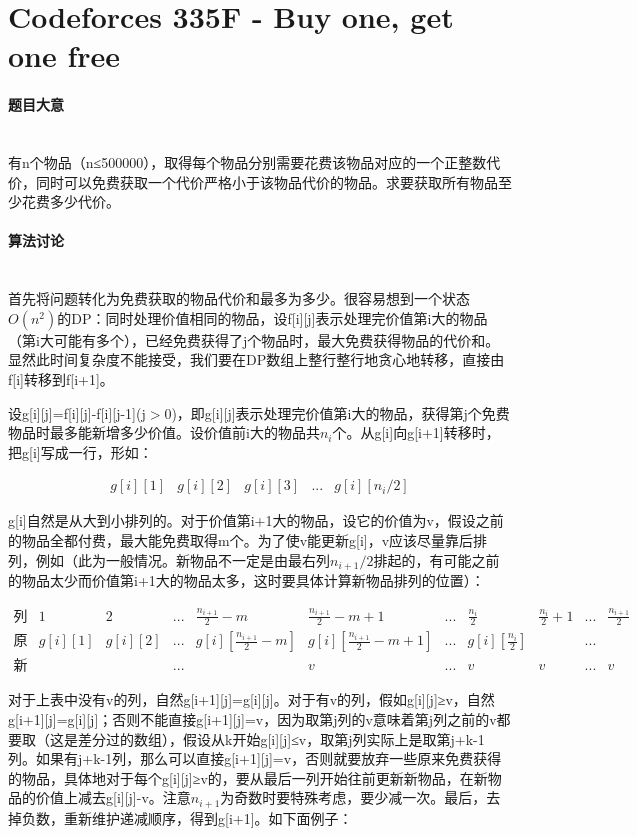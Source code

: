 \documentclass[UTF8]{ctexart}
\newcommand{\myparagraph}[1]{\paragraph{#1}\mbox{}\\}
\theoremstyle{nonumberplain}
\begin{document}
	\section{Codeforces 335F - Buy one, get one free}
	
		\myparagraph{题目大意}
			
			有n个物品（n≤500000），取得每个物品分别需要花费该物品对应的一个正整数代价，同时可以免费获取一个代价严格小于该物品代价的物品。求要获取所有物品至少花费多少代价。
			
		\myparagraph{算法讨论}
		
			首先将问题转化为免费获取的物品代价和最多为多少。很容易想到一个状态$O(n^2)$的DP：同时处理价值相同的物品，设f[i][j]表示处理完价值第i大的物品（第i大可能有多个），已经免费获得了j个物品时，最大免费获得物品的代价和。显然此时间复杂度不能接受，我们要在DP数组上整行整行地贪心地转移，直接由f[i]转移到f[i+1]。
			
			设g[i][j]=f[i][j]-f[i][j-1](j$>$0)，即g[i][j]表示处理完价值第i大的物品，获得第j个免费物品时最多能新增多少价值。设价值前i大的物品共$n_i$个。从g[i]向g[i+1]转移时，把g[i]写成一行，形如：
			
			$$ \begin{array}{ccccc} g[i][1] & g[i][2] & g[i][3] & ... & g[i][n_i/2] \end{array} $$
			
			g[i]自然是从大到小排列的。对于价值第i+1大的物品，设它的价值为v，假设之前的物品全都付费，最大能免费取得m个。为了使v能更新g[i]，v应该尽量靠后排列，例如（此为一般情况。新物品不一定是由最右列$n_{i+1}/2$排起的，有可能之前的物品太少而价值第i+1大的物品太多，这时要具体计算新物品排列的位置）：
			
			$$ \begin{array}{lcccccccccc}
				\mbox{列编号} & 1 & 2 & ... & \frac{n_{i+1}}{2}-m & \frac{n_{i+1}}{2}-m+1 & ... & \frac{n_i}{2} & \frac{n_i}{2}+1 & ... & \frac{n_{i+1}}{2} \\
				\mbox{原状态} & g[i][1] & g[i][2] & ... & g[i][\frac{n_{i+1}}{2}-m] & g[i][\frac{n_{i+1}}{2}-m+1] & ... & g[i][\frac{n_i}{2}] & & ... & \\
				\mbox{新物品} & & & ... & & v & ... & v & v & ... & v
			\end{array} $$
			
			对于上表中没有v的列，自然g[i+1][j]=g[i][j]。对于有v的列，假如g[i][j]≥v，自然g[i+1][j]=g[i][j]；否则不能直接g[i+1][j]=v，因为取第j列的v意味着第j列之前的v都要取（这是差分过的数组），假设从k开始g[i][j]≤v，取第j列实际上是取第j+k-1列。如果有j+k-1列，那么可以直接g[i+1][j]=v，否则就要放弃一些原来免费获得的物品，具体地对于每个g[i][j]≥v的，要从最后一列开始往前更新新物品，在新物品的价值上减去g[i][j]-v。注意$n_{i+1}$为奇数时要特殊考虑，要少减一次。最后，去掉负数，重新维护递减顺序，得到g[i+1]。如下面例子：
			
\end{document}
